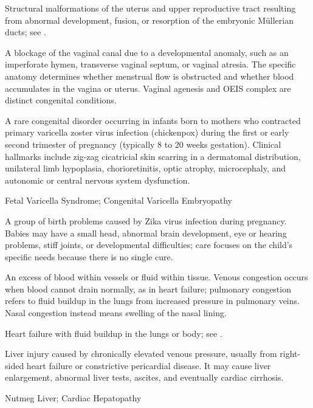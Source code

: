  Structural malformations of the uterus and upper reproductive tract resulting from abnormal development, fusion, or resorption of the embryonic Müllerian ducts; see .

 A blockage of the vaginal canal due
to a developmental anomaly, such as an imperforate hymen, transverse vaginal
septum, or vaginal atresia. The specific anatomy determines whether menstrual
flow is obstructed and whether blood accumulates in the vagina or uterus.
Vaginal agenesis and OEIS complex are distinct congenital conditions.

 A rare congenital disorder occurring in infants born to mothers who contracted primary varicella zoster virus infection (chickenpox) during the first or early second trimester of pregnancy (typically 8 to 20 weeks gestation). Clinical hallmarks include zig-zag cicatricial skin scarring in a dermatomal distribution, unilateral limb hypoplasia, chorioretinitis, optic atrophy, microcephaly, and autonomic or central nervous system dysfunction.

\synonyms
Fetal Varicella Syndrome; Congenital Varicella Embryopathy

 A group of birth problems caused by Zika virus infection during pregnancy. Babies may have a small head, abnormal brain development, eye or hearing problems, stiff joints, or developmental difficulties; care focuses on the child's specific needs because there is no single cure.

 An excess of blood within vessels or fluid within tissue. Venous congestion occurs when blood cannot drain normally, as in heart failure; pulmonary congestion refers to fluid buildup in the lungs from increased pressure in pulmonary veins. Nasal congestion instead means swelling of the nasal lining.

 Heart failure with fluid buildup in the lungs or body; see .

 Liver injury caused by chronically elevated venous pressure, usually from right-sided heart failure or constrictive pericardial disease. It may cause liver enlargement, abnormal liver tests, ascites, and eventually cardiac cirrhosis.

\synonyms
Nutmeg Liver; Cardiac Hepatopathy

